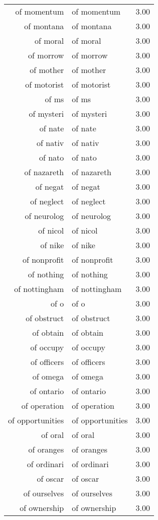 \begin{table}[ht]
\begin{tabular}{rlr}
  of momentum & of momentum & 3.00 \\ 
  of montana & of montana & 3.00 \\ 
  of moral & of moral & 3.00 \\ 
  of morrow & of morrow & 3.00 \\ 
  of mother & of mother & 3.00 \\ 
  of motorist & of motorist & 3.00 \\ 
  of ms & of ms & 3.00 \\ 
  of mysteri & of mysteri & 3.00 \\ 
  of nate & of nate & 3.00 \\ 
  of nativ & of nativ & 3.00 \\ 
  of nato & of nato & 3.00 \\ 
  of nazareth & of nazareth & 3.00 \\ 
  of negat & of negat & 3.00 \\ 
  of neglect & of neglect & 3.00 \\ 
  of neurolog & of neurolog & 3.00 \\ 
  of nicol & of nicol & 3.00 \\ 
  of nike & of nike & 3.00 \\ 
  of nonprofit & of nonprofit & 3.00 \\ 
  of nothing & of nothing & 3.00 \\ 
  of nottingham & of nottingham & 3.00 \\ 
  of o & of o & 3.00 \\ 
  of obstruct & of obstruct & 3.00 \\ 
  of obtain & of obtain & 3.00 \\ 
  of occupy & of occupy & 3.00 \\ 
  of officers & of officers & 3.00 \\ 
  of omega & of omega & 3.00 \\ 
  of ontario & of ontario & 3.00 \\ 
  of operation & of operation & 3.00 \\ 
  of opportunities & of opportunities & 3.00 \\ 
  of oral & of oral & 3.00 \\ 
  of oranges & of oranges & 3.00 \\ 
  of ordinari & of ordinari & 3.00 \\ 
  of oscar & of oscar & 3.00 \\ 
  of ourselves & of ourselves & 3.00 \\ 
  of ownership & of ownership & 3.00 \\ 

\end{tabular}
\end{table}
